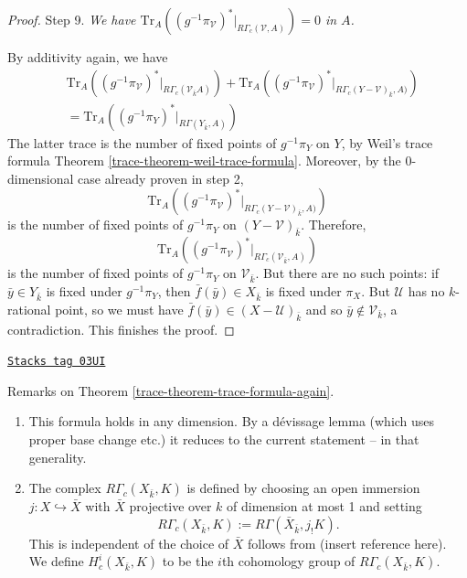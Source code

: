 \begin{proof}
\medskip\noindent
Step 9. {\it We have
$\text{Tr}_A((g^{-1}\pi_\mathcal{V})^* |_{R\Gamma_c(\mathcal{V}, A)}) = 0$
in $A$.}

\medskip\noindent
By additivity again, we have
\begin{eqnarray*}
& \text{Tr}_A((g^{-1}\pi_\mathcal{V})^* |_{R\Gamma_c(\mathcal{V}_{\bar k} A)})
+
\text{Tr}_A((g^{-1}\pi_\mathcal{V})^*
|_{R\Gamma_c(Y-\mathcal {V})_{\bar k}, A)}) \\
& =
\text{Tr}_A((g^{-1}\pi_Y)^* |_{R\Gamma(Y_{\bar k}, A)})
\end{eqnarray*}
The latter trace is the number of fixed points of $g^{-1}\pi_Y$ on $Y$, by
Weil's trace formula
Theorem \ref{trace-theorem-weil-trace-formula}.
Moreover, by the 0-dimensional case already proven in step 2,
$$
\text{Tr}_A((g^{-1}\pi_\mathcal{V})^*|_{R\Gamma_c(Y-\mathcal{V})_{\bar k}, A)})
$$
is the number of fixed points of $g^{-1}\pi_Y$ on $(Y-\mathcal{V})_{\bar k}$.
Therefore,
$$
\text{Tr}_A((g^{-1}\pi_\mathcal{V})^* |_{R\Gamma_c(\mathcal{V}_{\bar k}, A)})
$$
is the number of fixed points of $g^{-1}\pi_Y$ on $\mathcal{V}_{\bar k}$. But
there are no such points: if $\bar y\in Y_{\bar k}$ is fixed under
$g^{-1}\pi_Y$, then $\bar f(\bar y) \in X_{\bar k}$ is fixed under $\pi_X$. But
$\mathcal{U}$ has no $k$-rational point, so we must have $\bar f(\bar y)\in
(X-\mathcal{U})_{\bar k}$ and so $\bar y\notin \mathcal{V}_{\bar k}$, a
contradiction.
This finishes the proof.
\end{proof}

\begin{remark}
\label{trace-remark-on-trace-formula-again}
\href{https://stacks.math.columbia.edu/tag/03UI}{\texttt{Stacks tag 03UI}}

Remarks on Theorem \ref{trace-theorem-trace-formula-again}.
\begin{enumerate}
\item
This formula holds in any dimension. By a d\'evissage lemma (which uses proper
base change etc.) it reduces to the current statement -- in that generality.
\item
The complex $R\Gamma_c(X_{\bar k}, K)$ is defined by choosing an open immersion
$j : X \hookrightarrow \bar X$ with $\bar X$ projective over $k$ of dimension at
most 1 and setting
$$
R\Gamma_c(X_{\bar k}, K) := R\Gamma(\bar X_{\bar k}, j_!K).
$$
This is independent of the choice of $\bar X$ follows from
(insert reference here). We define $H^i_c(X_{\bar k}, K)$
to be the $i$th cohomology group of $R\Gamma_c(X_{\bar k}, K)$.
\end{enumerate}
\end{remark}

